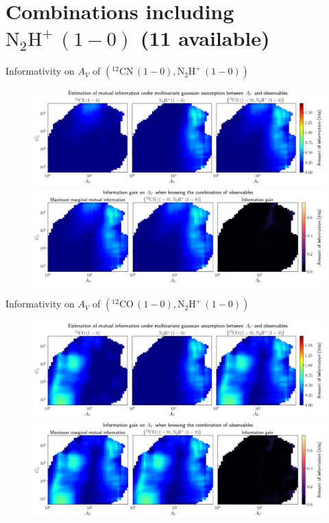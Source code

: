 \documentclass{beamer}
\begin{document}
\section{Combinations including $\mathrm{N_2H^+\,(1-0)}$ (11 available)}

\begin{frame}{Informativity on $A_V$ of $\left(\mathrm{^{12}CN\,(1-0)},\mathrm{N_2H^+\,(1-0)}\right)$}
    \begin{figure}
        \centering
        \includegraphics[width=0.95\linewidth]{../linearinfogauss/av__12cn10_n2hp10_linearinfogauss.png}
        \vfill
        \includegraphics[width=0.95\linewidth]{../linearinfogauss/av__12cn10_n2hp10_linearinfogauss_gain.png}
    \end{figure}
\end{frame}

\begin{frame}{Informativity on $A_V$ of $\left(\mathrm{^{12}CO\,(1-0)},\mathrm{N_2H^+\,(1-0)}\right)$}
    \begin{figure}
        \centering
        \includegraphics[width=0.95\linewidth]{../linearinfogauss/av__12co10_n2hp10_linearinfogauss.png}
        \vfill
        \includegraphics[width=0.95\linewidth]{../linearinfogauss/av__12co10_n2hp10_linearinfogauss_gain.png}
    \end{figure}
\end{frame}
\end{document}
